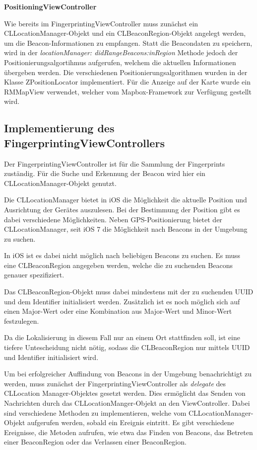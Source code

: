 \textbf{PositioningViewController}

Wie bereits im FingerprintingViewController muss zunächst ein CLLocationManager-Objekt und ein CLBeaconRegion-Objekt angelegt werden, um die Beacon-Informationen zu empfangen.
Statt die Beacondaten zu speichern, wird in der \emph{locationManager:
\newline didRangeBeacons:inRegion} Methode jedoch der Positionierungsalgortihmus aufgerufen, welchem die aktuellen Informationen übergeben werden. 
Die verschiedenen Positionierungsalgorithmen wurden in der Klasse ZPositionLocator implementiert.
Für die Anzeige auf der Karte wurde ein RMMapView verwendet, welcher vom Mapbox-Framework zur Verfügung gestellt wird.


\subsection{Implementierung des FingerprintingViewControllers}
\label{sec:}

Der FingerprintingViewController ist für die Sammlung der Fingerprints zuständig. 
Für die Suche und Erkennung der Beacon wird hier ein CLLocationManager-Objekt genutzt.

Die CLLocationManager bietet in iOS die Möglichkeit die aktuelle Position und Ausrichtung der Gerätes auszulesen. 
Bei der Bestimmung der Position gibt es dabei verschiedene Möglichkeiten. Neben GPS-Positionierung bietet der CLLocationManager, seit iOS 7 die Möglichkeit nach Beacons in der Umgebung zu suchen.

In iOS ist es dabei nicht möglich nach beliebigen Beacons zu suchen. Es muss eine CLBeaconRegion angegeben werden, welche die zu suchenden Beacons genauer spezifiziert. 

Das CLBeaconRegion-Objekt muss dabei mindestens mit der zu suchenden UUID und dem Identifier initialisiert werden. Zusätzlich ist es noch möglich sich auf einen Major-Wert oder eine Kombination aus Major-Wert und Minor-Wert festzulegen. 

Da die Lokalisierung in diesem Fall nur an einem Ort stattfinden soll, ist eine tiefere Untescheidung nicht nötig, sodass die CLBeaconRegion nur mittels UUID und Identifier initialisiert wird. 

Um bei erfolgreicher Auffindung von Beacons in der Umgebung benachrichtigt zu werden, muss zunächst der FingerprintingViewController als \emph{delegate} des CLLocation \newline Manager-Objektes gesetzt werden. 
Dies ermöglicht das Senden von Nachrichten durch das CLLocationManger-Objekt an den ViewController. Dabei sind verschiedene Methoden zu implementieren, welche vom CLLocationManager-Objekt aufgerufen werden, sobald ein Ereignis eintritt. Es gibt verschiedene Ereignisse, die Metoden aufrufen, wie etwa das Finden von Beacons, das Betreten einer BeaconRegion oder das Verlassen einer BeaconRegion. 


